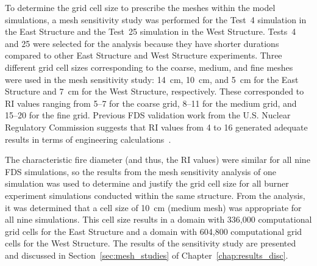 To determine the grid cell size to prescribe the meshes within the model simulations, a mesh sensitivity study was performed for the Test~4 simulation in the East Structure and the Test~25 simulation in the West Structure. Tests~4 and 25 were selected for the analysis because they have shorter durations compared to other East Structure and West Structure experiments. Three different grid cell sizes corresponding to the coarse, medium, and fine meshes were used in the mesh sensitivity study: 14~cm, 10~cm, and 5~cm for the East Structure and 7~cm for the West Structure, respectively. These corresponded to RI values ranging from 5--7 for the coarse grid, 8--11 for the medium grid, and 15--20 for the fine grid. Previous FDS validation work from the U.S. Nuclear Regulatory Commission suggests that RI values from 4 to 16 generated adequate results in terms of engineering calculations~\cite{NUREG_1824}.

The characteristic fire diameter (and thus, the RI values) were similar for all nine FDS simulations, so the results from the mesh sensitivity analysis of one simulation was used to determine and justify the grid cell size for all burner experiment simulations conducted within the same structure. From the analysis, it was determined that a cell size of 10~cm (medium mesh) was appropriate for all nine simulations. This cell size results in a domain with 336,000 computational grid cells for the East Structure and a domain with 604,800 computational grid cells for the West Structure. The results of the sensitivity study are presented and discussed in Section~\ref{sec:mesh_studies} of Chapter~\ref{chap:results_disc}.

